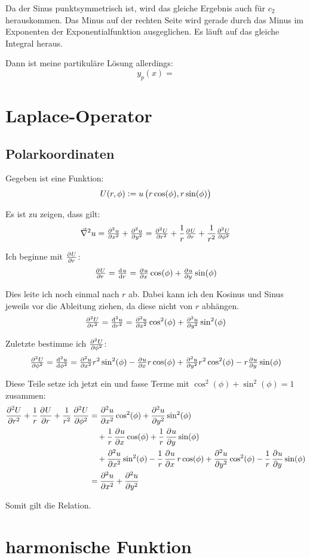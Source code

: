 \documentclass[11pt, ngerman]{article}
\newcommand{\laplace}{\vnabla^2}
\newcommand{\vnabla}{\vec \nabla}
\begin{document}
Da der Sinus punktsymmetrisch ist, wird das gleiche Ergebnis auch für $c_2$
herauskommen. Das Minus auf der rechten Seite wird gerade durch das Minus im
Exponenten der Exponentialfunktion ausgeglichen. Es läuft auf das gleiche
Integral heraus.

Dann ist meine partikuläre Lösung allerdings:
\[
	y_p(x) = 
\]

\section{Laplace-Operator}

\subsection{Polarkoordinaten}

Gegeben ist eine Funktion:
\[
	U(r, \phi) := u\del{r \cos(\phi), r \sin(\phi)}
\]

Es ist zu zeigen, dass gilt:
\[
	\laplace u = \pd[2] ux + \pd[2] uy = \pd[2] Ur + \frac 1r \pd Ur + \frac
	1{r^2} \pd[2] U\phi
\]

Ich beginne mit $\pd U r$:
\[
	\pd Ur = \od ur = \pd ux \cos(\phi) + \pd uy \sin(\phi)
\]

Dies leite ich noch einmal nach $r$ ab. Dabei kann ich den Kosinus und Sinus
jeweils vor die Ableitung ziehen, da diese nicht von $r$ abhängen.
\[
	\pd[2] Ur = \od[2] ur = \pd[2] ux \cos^2(\phi) + \pd[2] uy \sin^2(\phi)
\]

Zuletzte bestimme ich $\pd[2] U\phi$:
\[
	\pd[2] U\phi = \od[2] u\phi = \pd[2] ux r^2 \sin^2(\phi) - \pd ux r
	\cos(\phi) + \pd[2] uy r^2 \cos^2(\phi) - r \pd uy \sin(\phi)
\]

Diese Teile setze ich jetzt ein und fasse Terme mit $\cos^2(\phi) +
\sin^2(\phi) = 1$ zusammen:
%
\begin{align*}
	\dpd[2] Ur + \frac 1r \dpd Ur + \frac 1{r^2} \dpd[2] U\phi
	&=\dpd[2] ux \cos^2(\phi) + \dpd[2] uy \sin^2(\phi) \\
	&\quad+ \frac 1r \dpd ux \cos(\phi) + \frac 1r \dpd uy \sin(\phi) \\
	&\quad+ \dpd[2] ux \sin^2(\phi) - \frac 1r \dpd ux r \cos(\phi) + \dpd[2]
	uy \cos^2(\phi) - \frac 1r \dpd uy \sin(\phi) \\
	&= \dpd[2] ux + \dpd[2] uy
\end{align*}

Somit gilt die Relation.

\section{harmonische Funktion}
\end{document}
